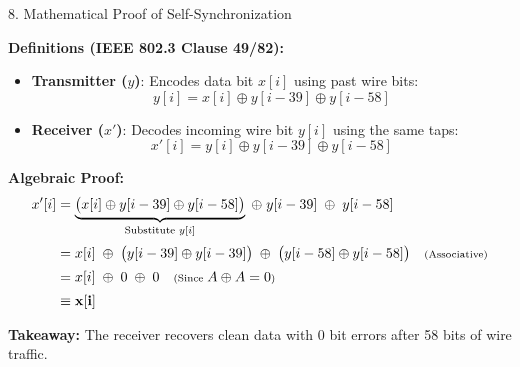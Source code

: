 \documentclass[aspectratio=169, 10pt]{beamer}
\begin{document}
\begin{frame}{8. Mathematical Proof of Self-Synchronization}
\vspace{0.5mm}

\textbf{Definitions (IEEE 802.3 Clause 49/82):}
\begin{itemize}\scriptsize
    \item \textbf{Transmitter ($y$)}: Encodes data bit $x[i]$ using past wire bits:
    $$y[i] = x[i] \oplus y[i - 39] \oplus y[i - 58]$$
    \item \textbf{Receiver ($x'$)}: Decodes incoming wire bit $y[i]$ using the same taps:
    $$x'[i] = y[i] \oplus y[i - 39] \oplus y[i - 58]$$
\end{itemize}

\vspace{0.5mm}
\begin{tcolorbox}[colback=BgSlate, colframe=PrimaryBlue, arc=1.5mm, top=1.2mm, bottom=1.2mm, left=3mm, right=3mm]
    \footnotesize\textbf{Algebraic Proof:}
    \vspace{-1.5mm}
    \begin{align*}
        x'[i] &= \underbrace{\big(x[i] \oplus y[i-39] \oplus y[i-58]\big)}_{\text{Substitute } y[i]} \;\oplus\; y[i-39] \;\oplus\; y[i-58] \\[2pt]
              &= x[i] \;\oplus\; \big(y[i-39] \oplus y[i-39]\big) \;\oplus\; \big(y[i-58] \oplus y[i-58]\big) \quad \text{\scriptsize (Associative)} \\[2pt]
              &= x[i] \;\oplus\; 0 \;\oplus\; 0 \quad \text{\scriptsize (Since } A \oplus A = 0\text{\scriptsize)} \\[2pt]
              &\equiv \mathbf{x[i]}
    \end{align*}
\end{tcolorbox}

\vspace{0.5mm}
\textbf{Takeaway:} The receiver recovers clean data with 0 bit errors after 58 bits of wire traffic.
\end{frame}
\end{document}
